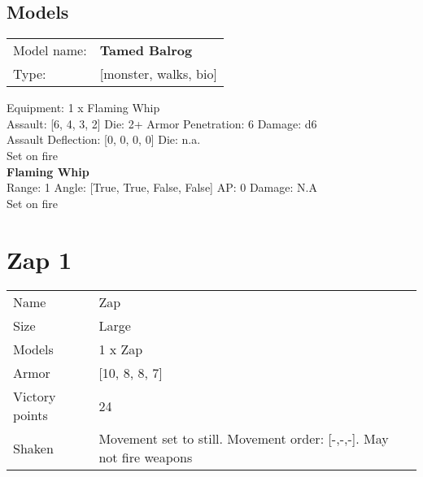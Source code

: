 \clearpage

\subsection{ Models }

\begin{tabular}{ll}
Model name: & {\bf Tamed Balrog } \\
Type: & [monster, walks, bio] \\
\end{tabular}

Equipment: 1 x Flaming Whip \\

Assault: [6, 4, 3, 2] Die: 2+ Armor Penetration: 6 Damage: d6 \\
Assault Deflection: [0, 0, 0, 0] Die: n.a.\\
\indent Set on fire\\ 
 



{\bf Flaming Whip } \\



Range: 1  Angle: [True, True, False, False] AP: 0 Damage: N.A \\
Set on fire\\ 




 















\clearpage

\section{ Zap 1 }

\begin{tabular}{ll}
  Name & Zap \\
  Size & Large\\
  Models & 1 x Zap\\
  Armor & [10, 8, 8, 7]\\
  Victory points & 24\\
  Shaken & Movement set to still. Movement order: [-,-,-]. May not fire weapons\\
\end{tabular}

